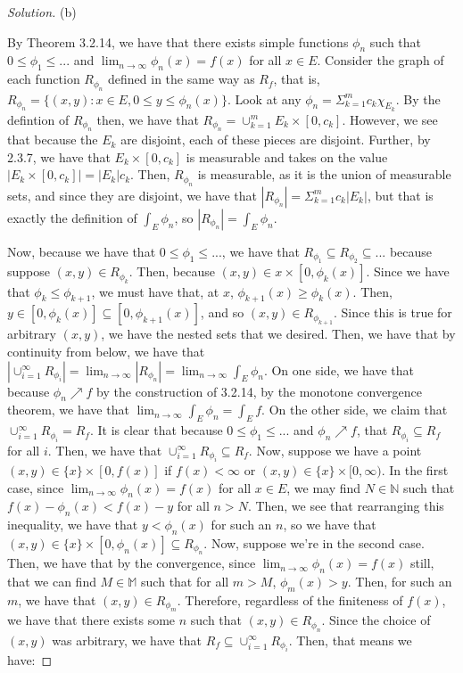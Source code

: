 \documentclass[10pt]{article}
\begin{document}
\begin{proof}[Solution]
(b)

By Theorem 3.2.14, we have that there exists simple functions $\phi_n$ such that $0 \leq \phi_1 \leq ...$ and $\lim_{n \to \infty} \phi_n(x) = f(x)$ for all $x \in E$. Consider the graph of each function $R_{\phi_n}$ defined in the same way as $R_f$, that is, $R_{\phi_n} =  \{ (x,y) : x \in E, 0 \leq y \leq \phi_n(x) \}$. Look at any $\phi_n = \Sigma_{k=1}^m c_k \chi_{E_k}$. By the defintion of $R_{\phi_n}$ then, we have that $R_{\phi_n} = \cup_{k=1}^m E_k \times [0,c_k]$. However, we see that because the $E_k$ are disjoint, each of these pieces are disjoint. Further, by 2.3.7, we have that $ E_k \times [0,c_k]$ is measurable and takes on the value $| E_k \times [0,c_k]| = |E_k|c_k$. Then, $R_{\phi_n}$ is measurable, as it is the union of measurable sets, and since they are disjoint, we have that $|R_{\phi_n}| = \Sigma_{k=1}^m c_k |E_k|$, but that is exactly the definition of $\int_E \phi_n$, so $|R_{\phi_n}| = \int_E \phi_n$. 

Now, because we have that  $0 \leq \phi_1 \leq ...$, we have that $R_{\phi_1} \subseteq R_{\phi_2} \subseteq...$ because suppose $(x,y) \in R_{\phi_k}$. Then, because $(x,y) \in x \times [0,\phi_k(x)]$. Since we have that $\phi_k \leq \phi_{k+1}$, we must have that, at $x$, $\phi_{k+1}(x) \geq \phi_{k}(x)$. Then, $y \in [0,\phi_k(x)] \subseteq [0,\phi_{k+1}(x)]$, and so $(x,y) \in R_{\phi_{k+1}}$. Since this is true for arbitrary $(x,y)$, we have the nested sets that we desired. Then, we have that by continuity from below, we have that $|\cup_{i=1}^\infty R_{\phi_i}| = \lim_{n \to \infty} | R_{\phi_n} | = \lim_{n \to \infty} \int_E \phi_n$. On one side, we have that because $\phi_n \nearrow f$ by the construction of 3.2.14, by the monotone convergence theorem, we have that $\lim_{n \to \infty} \int_E \phi_n = \int_E f$. On the other side, we claim that $\cup_{i=1}^\infty R_{\phi_i} = R_f$. It is clear that because  $0 \leq \phi_1 \leq ...$ and $\phi_n \nearrow f$, that $R_{\phi_i} \subseteq R_f$ for all $i$. Then, we have that $\cup_{i=1}^\infty R_{\phi_i} \subseteq R_f$. Now, suppose we have a point $(x,y) \in \{x \} \times [0,f(x)]$ if $f(x) < \infty$ or $(x,y) \in \{x \} \times [0,\infty)$. In the first case, since $\lim_{n \to \infty} \phi_n(x) = f(x)$ for all $x \in E$, we may find $N \in \mathbb{N}$ such that $f(x) - \phi_n(x) < f(x) - y$ for all $n > N$. Then, we see that rearranging this inequality, we have that $y < \phi_n(x)$ for such an $n$, so we have that $(x,y) \in \{ x \} \times [0,\phi_n(x)] \subseteq R_{\phi_n}$. Now, suppose we're in the second case. Then, we have that by the convergence, since $\lim_{n \to \infty} \phi_n(x) = f(x)$ still, that we can find $M \in \mathbb{M}$ such that for all $m > M$, $\phi_m(x) > y$. Then, for such an $m$, we have that $(x,y) \in R_{\phi_m}$. Therefore, regardless of the finiteness of $f(x)$, we have that there exists some $n$ such that $(x,y) \in R_{\phi_n}$. Since the choice of $(x,y)$ was arbitrary, we have that $R_f \subseteq \cup_{i=1}^\infty R_{\phi_i}$. Then, that means we have:


\end{proof}
\end{document}
